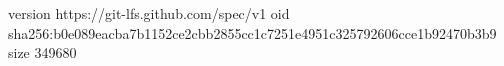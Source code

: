 version https://git-lfs.github.com/spec/v1
oid sha256:b0e089eacba7b1152ce2cbb2855cc1c7251e4951c325792606cce1b92470b3b9
size 349680
